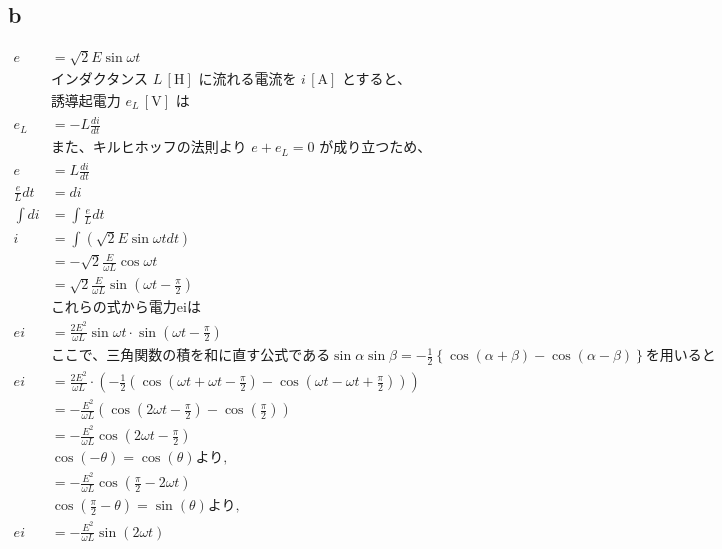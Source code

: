 \begin{flushleft}
  \subsection[short]{b}
  \begin{align*}
    e &= \sqrt{2}E \sin \omega t \\
    &\text{インダクタンス } L\,[\text{H}] \text{ に流れる電流を } i\,[\text{A}] \text{ とすると、} \\
    &\text{誘導起電力 } e_L\,[\text{V}] \text{ は} \\
    e_L &= -L \frac{di}{dt} \\
    &\text{また、キルヒホッフの法則より } e + e_L = 0 \text{ が成り立つため、} \\
    e &= L \frac{di}{dt} \\
    \frac{e}{L} dt &= di \\
    \int di &= \int \frac{e}{L} dt \\
    i &= \int \left(\sqrt{2} E \sin \omega t dt\right) \\
      &= - \sqrt{2} \frac{E}{\omega L} \cos \omega t \\
      &= \sqrt{2}\frac{E}{\omega L}\sin \left(\omega t - \frac{\pi}{2}\right) \\
    &\text{これらの式から電力eiは} \\
    ei  &= \frac{2E^2}{\omega L}\sin \omega t \cdot \sin \left(\omega t - \frac{\pi}{2}\right)\\
    &\text{ここで、三角関数の積を和に直す公式である}
    \sin \alpha \sin \beta = -\frac{1}{2} \left\{ \cos \left( \alpha + \beta\right) - \cos \left( \alpha - \beta\right)\right\}を用いると\\
    ei  &= \frac{2E^2}{\omega L} \cdot \left(- \frac{1}{2} \left(\cos\left(\omega t + \omega t - \frac{\pi}{2}\right) - \cos\left(\omega t - \omega t + \frac{\pi}{2}\right) \right) \right)\\
        &= -\frac{E^2}{\omega L} \left(\cos \left(2\omega t - \frac{\pi}{2}\right) - \cos\left( \frac{\pi}{2}\right)\right)\\
        &= -\frac{E^2}{\omega L} \cos \left(2\omega t - \frac{\pi}{2}\right)\\
    &\cos\left(- \theta\right) = \cos\left(\theta\right)\text{より,}\\
        &= -\frac{E^2}{\omega L}\cos \left(\frac{\pi}{2} - 2\omega t\right)\\
    &\cos\left(\frac{\pi}{2} - \theta\right) = \sin\left(\theta\right)\text{より,}\\
    ei  &= -\frac{E^2}{\omega L} \sin \left(2\omega t\right) \\
  \end{align*}
\end{flushleft}